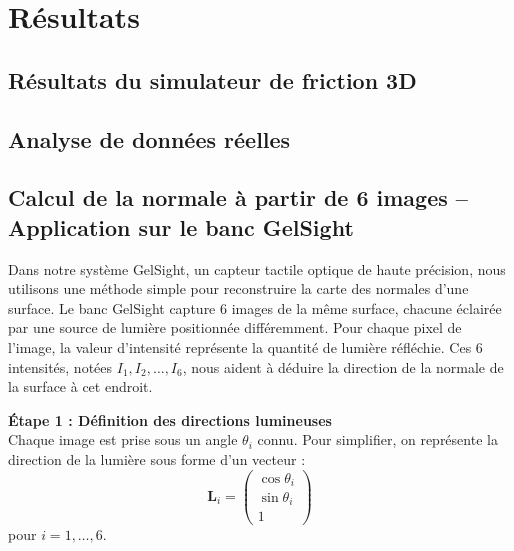 \chapter{Résultats}

\section{Résultats du simulateur de friction 3D}
\lipsum[1]

\section{Analyse de données réelles}
\lipsum[1]

\section*{Calcul de la normale à partir de 6 images – Application sur le banc GelSight}

Dans notre système GelSight, un capteur tactile optique de haute précision, nous utilisons une méthode simple pour reconstruire la carte des normales d'une surface. Le banc GelSight capture 6 images de la même surface, chacune éclairée par une source de lumière positionnée différemment. Pour chaque pixel de l'image, la valeur d'intensité représente la quantité de lumière réfléchie. Ces 6 intensités, notées \( I_1, I_2, \dots, I_6 \), nous aident à déduire la direction de la normale de la surface à cet endroit.

\vspace{0.5em}
\textbf{Étape 1 : Définition des directions lumineuses}\\
Chaque image est prise sous un angle \(\theta_i\) connu. Pour simplifier, on représente la direction de la lumière sous forme d'un vecteur :
\[
\mathbf{L}_i = \begin{pmatrix} \cos\theta_i \\ \sin\theta_i \\ 1 \end{pmatrix}
\]
pour \( i = 1, \dots, 6 \).

